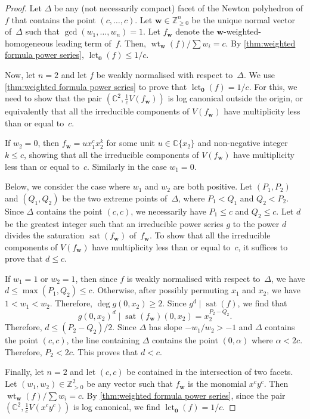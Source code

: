 \documentclass[a4paper, 12pt, oneside]{article}
\theoremstyle{plain}
\theoremstyle{definition}
\theoremstyle{remark}
\numberwithin{theorem}{section}
\numberwithin{table}{section}
\numberwithin{equation}{theorem}
\begin{document}
\begin{proof}
Let $\Delta$ be any (not necessarily compact) facet of the Newton polyhedron of $f$ that contains the point $(c, \ldots, c)$. Let $\bm w \in \mathbb Z_{\geq0}^n$ be the unique normal vector of~$\Delta$ such that $\gcd(w_1, \ldots, w_n) = 1$. Let $f_{\bm w}$ denote the $\bm w$-weighted-homogeneous leading term of~$f$. Then, $\operatorname{wt}_{\bm w}(f) / \sum w_i = c$. By \cref{thm:weighted formula power series}, $\operatorname{lct}_{\bm 0}(f) \leq 1/c$.

Now, let $n = 2$ and let $f$ be weakly normalised with respect to~$\Delta$. We use \cref{thm:weighted formula power series} to prove that $\operatorname{lct}_{\bm 0}(f) = 1/c$. For this, we need to show that the pair $(\mathbb C^2, \frac{1}{c} V(f_{\bm w}))$ is log canonical outside the origin, or equivalently that all the irreducible components of $V(f_{\bm w})$ have multiplicity less than or equal to~$c$.

If $w_2 = 0$, then $f_{\bm w} = u x_1^c x_2^k$ for some unit $u \in \mathbb C\{x_2\}$ and non-negative integer~$k \leq c$, showing that all the irreducible components of $V(f_{\bm w})$ have multiplicity less than or equal to~$c$. Similarly in the case $w_1 = 0$.

Below, we consider the case where $w_1$ and $w_2$ are both positive. Let $(P_1, P_2)$ and $(Q_1, Q_2)$ be the two extreme points of~$\Delta$, where $P_1 < Q_1$ and $Q_2 < P_2$. Since $\Delta$ contains the point $(c, c)$, we necessarily have $P_1 \leq c$ and $Q_2 \leq c$. Let $d$ be the greatest integer such that an irreducible power series $g$ to the power $d$ divides the saturation $\operatorname{sat}(f_{\bm w})$ of~$f_{\bm w}$. To show that all the irreducible components of $V(f_{\bm w})$ have multiplicity less than or equal to~$c$, it suffices to prove that $d \leq c$.

If $w_1 = 1$ or $w_2 = 1$, then since $f$ is weakly normalised with respect to~$\Delta$, we have $d \leq \max(P_1, Q_2) \leq c$. Otherwise, after possibly permuting $x_1$ and $x_2$, we have $1 < w_1 < w_2$. Therefore, $\deg g(0, x_2) \geq 2$. Since $g^d \mid \operatorname{sat}(f)$, we find that
\[
g(0, x_2)^d \mid \operatorname{sat}(f_{\bm w})(0, x_2) = x_2^{P_2 - Q_2}.
\]
Therefore, $d \leq (P_2 - Q_2)/2$. Since $\Delta$ has slope $-w_1/w_2 > -1$ and $\Delta$ contains the point $(c, c)$, the line containing $\Delta$ contains the point $(0, \alpha)$ where $\alpha < 2c$. Therefore, $P_2 < 2c$. This proves that $d < c$.

Finally, let $n = 2$ and let $(c, c)$ be contained in the intersection of two facets. Let $(w_1, w_2) \in \mathbb Z_{>0}^2$ be any vector such that $f_{\bm w}$ is the monomial $x^c y^c$. Then $\operatorname{wt}_{\bm w}(f) / \sum w_i = c$. By \cref{thm:weighted formula power series}, since the pair $(\mathbb C^2, \frac{1}{c} V(x^c y^c))$ is log canonical, we find $\operatorname{lct}_{\bm 0}(f) = 1/c$.
\end{proof}
\end{document}
